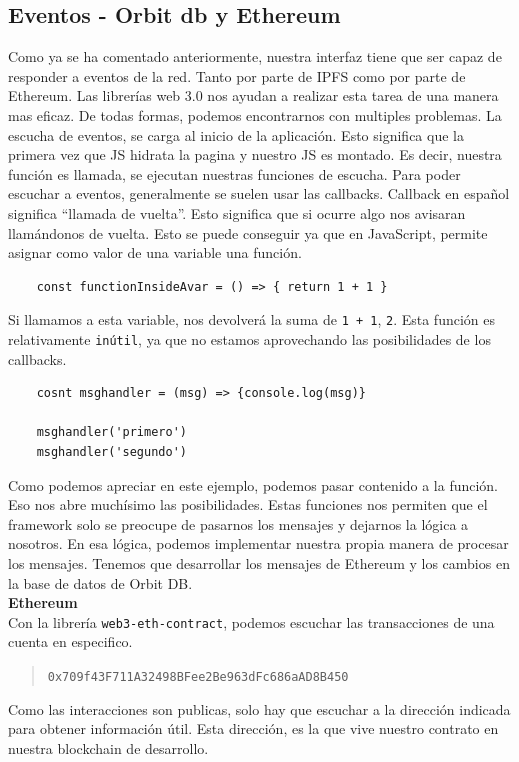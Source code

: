 \subsection{Eventos - Orbit db y Ethereum}
Como ya se ha comentado anteriormente, nuestra interfaz tiene que ser capaz de responder a eventos de la red. Tanto por parte de IPFS como por parte de Ethereum.
Las librerías web 3.0 nos ayudan a realizar esta tarea de una manera mas eficaz. De todas formas, podemos encontrarnos con multiples problemas.
La escucha de eventos, se carga al inicio de la aplicación. Esto significa que la primera vez que JS hidrata la pagina y nuestro JS es montado. Es decir, nuestra función es llamada, se ejecutan nuestras funciones de escucha.
Para poder escuchar a eventos, generalmente se suelen usar las callbacks. Callback en español significa “llamada de vuelta”. Esto significa que si ocurre algo nos avisaran llamándonos de vuelta.
Esto se puede conseguir ya que en JavaScript, permite asignar como valor de una variable una función.
\begin{lstlisting}
    const functionInsideAvar = () => { return 1 + 1 }
\end{lstlisting}
Si llamamos a esta variable, nos devolverá la suma de \verb|1 + 1|, \verb|2|.
Esta función es relativamente \verb|inútil|, ya que no estamos aprovechando las posibilidades de los callbacks.
\begin{lstlisting}
    cosnt msghandler = (msg) => {console.log(msg)}

    msghandler('primero')
    msghandler('segundo')
\end{lstlisting}
Como podemos apreciar en este ejemplo, podemos pasar contenido a la función. Eso nos abre muchísimo las posibilidades.  Estas funciones nos permiten que el framework solo se preocupe de pasarnos los mensajes y dejarnos la lógica a nosotros. En esa lógica, podemos implementar nuestra propia manera de procesar los mensajes. Tenemos que desarrollar los mensajes de Ethereum y los cambios en la base de datos de Orbit DB.\\
\textbf{Ethereum}\\
Con la librería \verb|web3-eth-contract|, podemos escuchar las transacciones de una cuenta en especifico.
\begin{quote}
    \verb|0x709f43F711A32498BFee2Be963dFc686aAD8B450|
\end{quote}
Como las interacciones son publicas, solo hay que escuchar a la dirección indicada para obtener información útil. Esta dirección, es la que vive nuestro contrato en nuestra blockchain de desarrollo.
